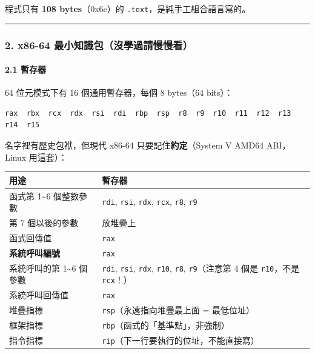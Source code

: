 \documentclass[10pt,a4paper]{article}
\newcounter{none}
\begin{document}
程式只有 \textbf{108 bytes}（0x6c）的
\texttt{.\allowbreak{}text}，是純手工組合語言寫的。

\begin{center}\rule{0.5\linewidth}{0.5pt}\end{center}

\subsubsection{2. x86-64
最小知識包（沒學過請慢慢看）}\label{x86-64-ux6700ux5c0fux77e5ux8b58ux5305ux6c92ux5b78ux904eux8acbux6162ux6162ux770b}

\paragraph{2.1 暫存器}\label{ux66abux5b58ux5668-1}

64 位元模式下有 16 個通用暫存器，每個 8 bytes（64 bits）：

\begin{Verbatim}[breaklines=true,breakanywhere=true,breakautoindent=false,fontsize=\fontsize{7.0}{9.5}\selectfont]
rax  rbx  rcx  rdx  rsi  rdi  rbp  rsp  r8  r9  r10  r11  r12  r13  r14  r15
\end{Verbatim}

名字裡有歷史包袱，但現代 x86-64 只要記住\textbf{約定}（System V AMD64
ABI，Linux 用這套）：

{\def\LTcaptype{none} %
\begin{longtable}[]{@{}
  >{\raggedright\arraybackslash}p{}
  >{\raggedright\arraybackslash}p{}@{}}
\toprule\noalign{}
\begin{minipage}[b]{\linewidth}\raggedright
用途
\end{minipage} & \begin{minipage}[b]{\linewidth}\raggedright
暫存器
\end{minipage} \\
\midrule\noalign{}
\endhead
\bottomrule\noalign{}
\endlastfoot
函式第 1\textasciitilde6 個整數參數 & \texttt{rdi}, \texttt{rsi},
\texttt{rdx}, \texttt{rcx}, \texttt{r8}, \texttt{r9} \\
第 7 個以後的參數 & 放堆疊上 \\
函式回傳值 & \texttt{rax} \\
\textbf{系統呼叫編號} & \texttt{rax} \\
系統呼叫的第 1\textasciitilde6 個參數 & \texttt{rdi}, \texttt{rsi},
\texttt{rdx}, \texttt{r10}, \texttt{r8}, \texttt{r9}（注意第 4 個是
\texttt{r10}，不是 \texttt{rcx}！） \\
系統呼叫回傳值 & \texttt{rax} \\
堆疊指標 & \texttt{rsp}（永遠指向堆疊最上面 = 最低位址） \\
框架指標 & \texttt{rbp}（函式的「基準點」，非強制） \\
指令指標 & \texttt{rip}（下一行要執行的位址，不能直接寫） \\
\end{longtable}
}
\end{document}
